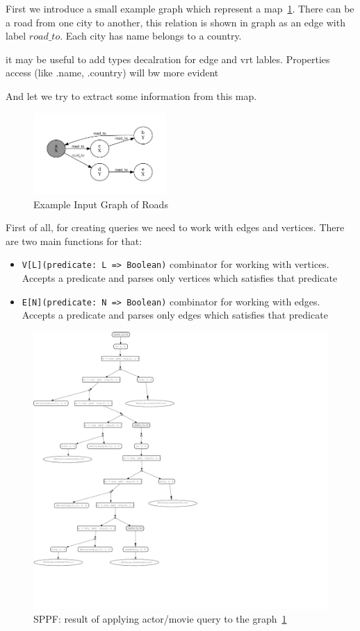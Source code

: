 First we introduce a small example graph which represent a map~\ref{fig:graph}.
There can be a road from one city to another, this relation is shown in graph as an edge with label $road\_to$.
Each city has name belongs to a country. 

{it may be useful to add types decalration for edge and vrt lables. Properties access (like .name, .country) will bw more evident}

And let we try to extract some information from this map.

\begin{figure}[h]
\includegraphics[width=0.45\textwidth]{graph}
\caption{Example Input Graph of Roads}
\label{fig:graph}
\end{figure}

First of all, for creating queries we need to work with edges and vertices.
There are two main functions for that:
\begin{itemize}
    \item \lstinline{V[L](predicate: L => Boolean)} combinator for working with vertices. Accepts a predicate and parses only vertices which satisfies that predicate
    \item \lstinline{E[N](predicate: N => Boolean)} combinator for working with edges. Accepts a predicate and parses only edges which satisfies that predicate  
\end{itemize}

\begin{figure}[h]
\includegraphics[scale=0.38]{sppf}
\caption{SPPF: result of applying actor/movie query to the graph~\ref{fig:graph}}
\label{fig:sppf}
\end{figure}

